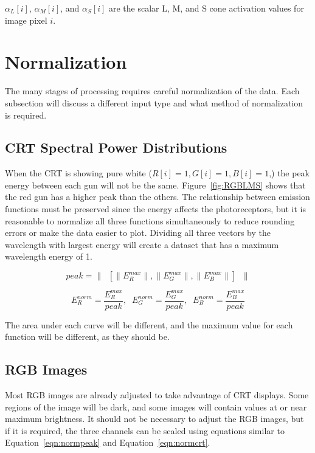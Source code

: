 \documentclass[12pt]{article}
\begin{document}
$\alpha_L[i]$, $\alpha_M[i]$, and $\alpha_S[i]$ are the scalar L, M,
and S cone activation values for image pixel $i$.


\section{Normalization}

The many stages of processing requires careful normalization of the
data.  Each subsection will discuss a different input type and what
method of normalization is required.

\subsection{CRT Spectral Power Distributions}

When the CRT is showing pure white ($R[i]=1,G[i]=1,B[i]=1$,) the peak
energy between each gun will not be the same.  Figure~\ref{fig:RGBLMS}
shows that the red gun has a higher peak than the others.  The
relationship between emission functions must be preserved since the
energy affects the photoreceptors, but it is reasonable to normalize
all three functions simultaneously to reduce rounding errors or make
the data easier to plot.  Dividing all three vectors by the wavelength
with largest energy will create a dataset that has a maximum
wavelength energy of 1.

\begin{equation}
peak = \| \;\; [\|E_R^{max}\|, \|E_G^{max}\|, \|E_B^{max}\|] \;\; \|
\label{eqn:normpeak}
\end{equation}

\begin{equation}
E_R^{norm}=\frac{E_R^{max}}{peak}, \;\;
E_G^{norm}=\frac{E_G^{max}}{peak}, \;\;
E_B^{norm}=\frac{E_B^{max}}{peak}
\label{eqn:normcrt}
\end{equation}

The area under each curve will be different, and the maximum value for
each function will be different, as they should be.

\subsection{RGB Images}

Most RGB images are already adjusted to take advantage of CRT
displays.  Some regions of the image will be dark, and some images
will contain values at or near maximum brightness.  It should not be
necessary to adjust the RGB images, but if it is required, the three
channels can be scaled using equations similar to
Equation~\ref{eqn:normpeak} and Equation~\ref{eqn:normcrt}.
\end{document}
